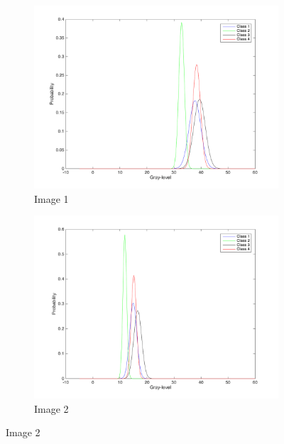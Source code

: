 \documentclass[12pt,a4paper]{report}
\begin{document}
\begin{figure}[!ht]
	\begin{subfigure}{0.5\textwidth}
	\centering
	\includegraphics[width=1.0\textwidth]{Feature1ProbabilityDistribution}	
	\caption*{Image 1}
	\end{subfigure}
	\begin{subfigure}{0.5\textwidth}
	\centering
	\includegraphics[width=1.0\textwidth]{Feature2ProbabilityDistribution}
	\caption*{Image 2}
	\end{subfigure}
\end{figure}
\end{document}
